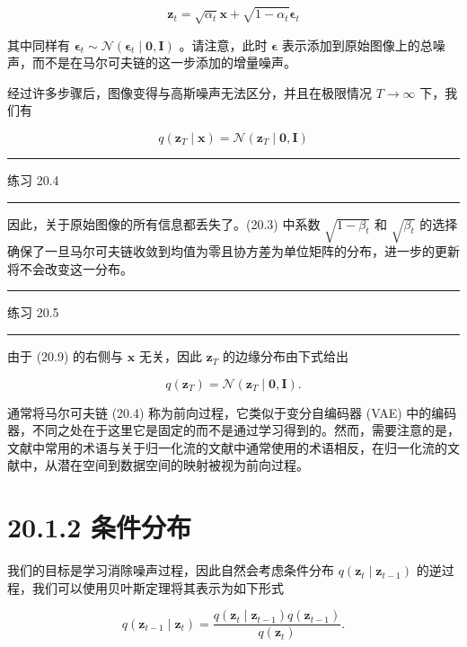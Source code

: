 \documentclass[10pt]{report}
\newcommand{\HRule}{\begin{center}\rule{0.9\linewidth}{0.2mm}\end{center}}
\begin{document}
\[
{\mathbf{z}}_{t} = \sqrt{{\alpha }_{t}}\mathbf{x} + \sqrt{1 - {\alpha }_{t}}{\mathbf{\epsilon }}_{t} \tag{20.8}
\]

其中同样有 \({\mathbf{\epsilon }}_{t} \sim  \mathcal{N}\left( {{\mathbf{\epsilon }}_{t} \mid  \mathbf{0},\mathbf{I}}\right)\) 。请注意，此时 \(\mathbf{\epsilon }\) 表示添加到原始图像上的总噪声，而不是在马尔可夫链的这一步添加的增量噪声。

经过许多步骤后，图像变得与高斯噪声无法区分，并且在极限情况 \(T \rightarrow  \infty\) 下，我们有

\[
q\left( {{\mathbf{z}}_{T} \mid  \mathbf{x}}\right)  = \mathcal{N}\left( {{\mathbf{z}}_{T} \mid  \mathbf{0},\mathbf{I}}\right)  \tag{20.9}
\]

\HRule

练习 20.4

\HRule

因此，关于原始图像的所有信息都丢失了。(20.3) 中系数 \(\sqrt{1 - {\beta }_{t}}\) 和 \(\sqrt{{\beta }_{t}}\) 的选择确保了一旦马尔可夫链收敛到均值为零且协方差为单位矩阵的分布，进一步的更新将不会改变这一分布。

\HRule

练习 20.5

\HRule

由于 (20.9) 的右侧与 \(\mathbf{x}\) 无关，因此 \({\mathbf{z}}_{T}\) 的边缘分布由下式给出

\[
q\left( {\mathbf{z}}_{T}\right)  = \mathcal{N}\left( {{\mathbf{z}}_{T} \mid  \mathbf{0},\mathbf{I}}\right) . \tag{20.10}
\]

通常将马尔可夫链 (20.4) 称为前向过程，它类似于变分自编码器 (VAE) 中的编码器，不同之处在于这里它是固定的而不是通过学习得到的。然而，需要注意的是，文献中常用的术语与关于归一化流的文献中通常使用的术语相反，在归一化流的文献中，从潜在空间到数据空间的映射被视为前向过程。

\section*{20.1.2 条件分布}

我们的目标是学习消除噪声过程，因此自然会考虑条件分布 \(q\left( {{\mathbf{z}}_{t} \mid  {\mathbf{z}}_{t - 1}}\right)\) 的逆过程，我们可以使用贝叶斯定理将其表示为如下形式

\[
q\left( {{\mathbf{z}}_{t - 1} \mid  {\mathbf{z}}_{t}}\right)  = \frac{q\left( {{\mathbf{z}}_{t} \mid  {\mathbf{z}}_{t - 1}}\right) q\left( {\mathbf{z}}_{t - 1}\right) }{q\left( {\mathbf{z}}_{t}\right) }. \tag{20.11}
\]
\end{document}
